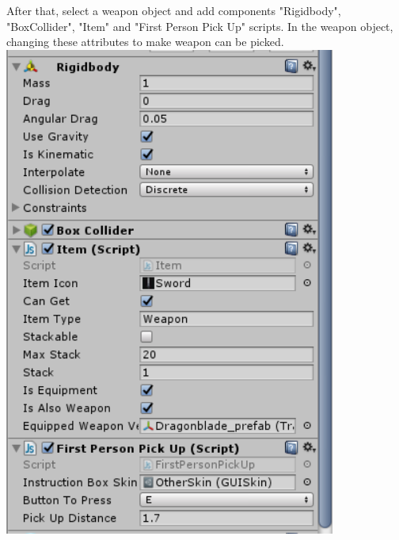 \begin{itemize}
After that, select a weapon object and add components "Rigidbody", "BoxCollider", "Item" and "First Person Pick Up" scripts. In the weapon object, changing these attributes to make weapon can be picked.\\
\includegraphics[scale=0.5]{img/Weapon.png}\\
\end{itemize}




